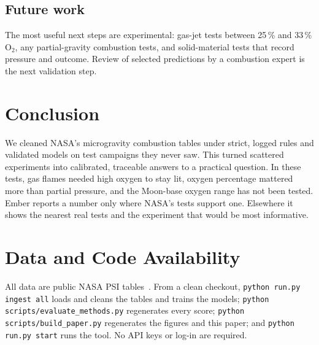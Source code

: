 \documentclass[11pt,twocolumn]{article}
\newcommand{\Otwo}{\ensuremath{\mathrm{O_2}}}
\newcommand{\pct}{\,\%}
\begin{document}
\subsection{Future work}

The most useful next steps are experimental: gas-jet tests between 25\pct{} and 33\pct{} \Otwo, any
partial-gravity combustion tests, and solid-material tests that record pressure and outcome. Review of
selected predictions by a combustion expert is the next validation step.

\section{Conclusion}

We cleaned NASA's microgravity combustion tables under strict, logged rules and validated models on test
campaigns they never saw. This turned scattered experiments into calibrated, traceable answers to a
practical question. In these tests, gas flames needed high oxygen to stay lit, oxygen percentage mattered
more than partial pressure, and the Moon-base oxygen range has not been tested. Ember reports a number only
where NASA's tests support one. Elsewhere it shows the nearest real tests and the experiment that would be
most informative.

\section*{Data and Code Availability}

All data are public NASA PSI tables~\cite{psi}. From a clean checkout, \texttt{python run.py ingest all}
loads and cleans the tables and trains the models; \texttt{python scripts/evaluate\_methods.py} regenerates
every score; \texttt{python scripts/build\_paper.py} regenerates the figures and this paper; and
\texttt{python run.py start} runs the tool. No API keys or log-in are required.
\end{document}
